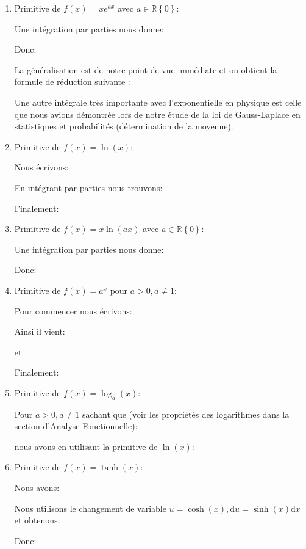 \begin{enumerate}
		
		\item Primitive de $f(x)=xe^{ax}$ avec $a\in \mathbb{R}\left\lbrace 0 \right\rbrace$:
		
		Une intégration par parties nous donne:
		
		Donc:
		
		La généralisation est de notre point de vue immédiate et on obtient la formule de réduction suivante :
		
		\begin{tcolorbox}[title=Remarque,colframe=black,arc=10pt]
		Une autre intégrale très importante avec l'exponentielle en physique est celle que nous avions démontrée lors de notre étude de la loi de Gauss-Laplace en statistiques et probabilités (détermination de la moyenne).
		\end{tcolorbox}
		
		\item Primitive de $f(x)=\ln(x)$:
		
		Nous écrivons:
		
		En intégrant par parties nous trouvons:
		
		Finalement:
		
		
		\item Primitive de $f(x)=x\ln(ax)$ avec $a\in \mathbb{R}\left\lbrace 0 \right\rbrace$:
		
		Une intégration par parties nous donne:
		
		Donc:
		
		
		\item Primitive de $f(x)=a^x$ pour $a>0,a\neq 1$:
		
		Pour commencer nous écrivons:
		
		Ainsi il vient:
		
		et:
		
		Finalement:
		
		
		\item Primitive de $f(x)=\log_a(x)$:
		
		Pour $a>0,a\neq 1$ sachant que (voir les propriétés des logarithmes dans la section d'Analyse Fonctionnelle):
		
		nous avons en utilisant la primitive de  $\ln(x)$:
		
		
		\item Primitive de $f(x)=\tanh(x)$:
		
		Nous avons:
		
		Nous utilisons le changement de variable $u=\cosh(x),\mathrm{d}u=\sinh(x)\mathrm{d}x$ et obtenons:
		
		Donc:
		

\end{enumerate}

